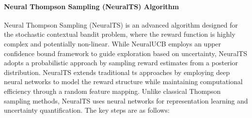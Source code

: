 \paragraph{Neural Thompson Sampling (NeuralTS) Algorithm} 

Neural Thompson Sampling (NeuralTS) \citep{zhang2021neural} is an advanced algorithm designed for the stochastic contextual bandit problem, where the reward function is highly complex and potentially non-linear.
While NeuralUCB employs an upper confidence bound framework to guide exploration based on uncertainty, NeuralTS adopts a probabilistic approach by sampling reward estimates from a posterior distribution. NeuralTS extends traditional \acl{ts} approaches by employing deep neural networks to model the reward structure while maintaining computational efficiency through a random feature mapping. Unlike classical Thompson sampling methods, NeuralTS uses neural networks for representation learning and uncertainty quantification. The key steps are as follows:  
